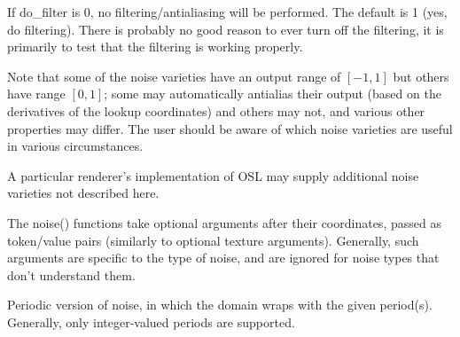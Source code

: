 \documentclass[11pt,letterpaper]{book}
\begin{document}
\vspace{12pt}
If {\cf do_filter} is 0, no filtering/antialiasing will
be performed.  The default is 1 (yes, do filtering).  There is probably
no good reason to ever turn off the filtering, it is primarily to test
that the filtering is working properly.
\apiend
\vspace{-16pt}

\apiend


Note that some of the noise varieties have an output range of $[-1,1]$
but others have range $[0,1]$; some may automatically antialias their
output (based on the derivatives of the lookup coordinates) and others
may not, and various other properties may differ.  The user should be
aware of which noise varieties are useful in various circumstances.

A particular renderer's implementation of OSL may supply additional
noise varieties not described here.

The {\cf noise()} functions take optional arguments after their
coordinates, passed as token/value pairs (similarly to optional texture
arguments).  Generally, such arguments are specific to the type of
noise, and are ignored for noise types that don't understand them.

\apiend




Periodic version of {\cf noise}, in which the domain wraps with the given
period(s).  Generally, only integer-valued periods are supported.
\apiend




\end{document}
